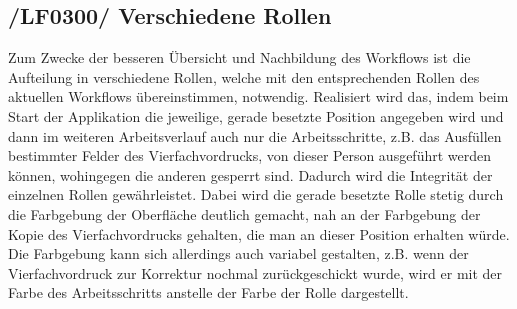\subsection{/LF0300/ Verschiedene Rollen}
Zum Zwecke der besseren Übersicht und Nachbildung des Workflows ist die Aufteilung in verschiedene Rollen, welche mit den entsprechenden Rollen des aktuellen Workflows übereinstimmen, notwendig. Realisiert wird das, indem beim Start der Applikation die jeweilige, gerade besetzte Position angegeben wird und dann im weiteren Arbeitsverlauf auch nur die Arbeitsschritte, z.B. das Ausfüllen bestimmter Felder des Vierfachvordrucks, von dieser Person ausgeführt werden können, wohingegen die anderen gesperrt sind. Dadurch wird die Integrität der einzelnen Rollen gewährleistet. Dabei wird die gerade besetzte Rolle stetig durch die Farbgebung der Oberfläche deutlich gemacht, nah an der Farbgebung der Kopie des Vierfachvordrucks gehalten, die man an dieser Position erhalten würde. Die Farbgebung kann sich allerdings auch variabel gestalten, z.B. wenn der Vierfachvordruck zur Korrektur nochmal zurückgeschickt wurde, wird er mit der Farbe des Arbeitsschritts anstelle der Farbe der Rolle dargestellt. 
